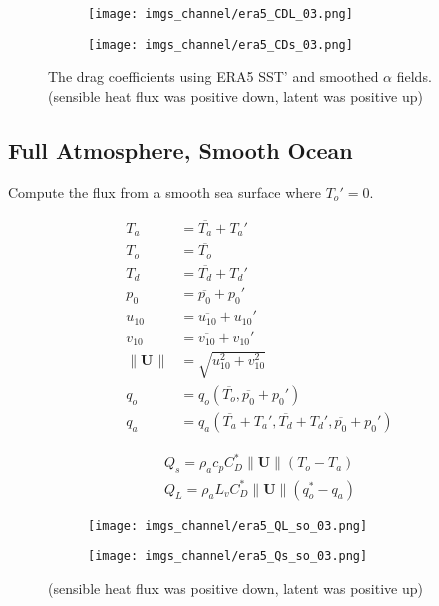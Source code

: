 \documentclass[12pt,a4paper]{article}
\newcommand{\Vmag}[1]{\| \mathbf{#1}\|}
\begin{document}
\begin{figure}[h!]
\centering
\begin{subfigure}[t]{0.49\textwidth}
\texttt{[image: imgs\_channel/era5\_CDL\_03.png]}
\end{subfigure}
\begin{subfigure}[t]{0.49\textwidth}
\texttt{[image: imgs\_channel/era5\_CDs\_03.png]}
\end{subfigure}
\caption{The drag coefficients using ERA5 SST' and smoothed $\alpha$ fields. (sensible heat flux was positive down, latent was positive up)}
\end{figure}

\subsection{Full Atmosphere, Smooth Ocean}
Compute the flux from a smooth sea surface where $T_o' = 0$.

\begin{align}
T_a &=\overline{T_a} + T_a' \\
T_o &=\overline{T_o}  \\
T_d &=\overline{T_d} + T_d' \\
p_0 &=\overline{p_0} + p_0' \\
u_{10} &= \overline{u_{10}} + u_{10}' \\
v_{10} &= \overline{v_{10}} + v_{10}'\\
\Vmag{U} &= \sqrt{u_{10}^2 + v_{10}^2}\\
q_o &= q_o(\overline{T_o},\overline{p_0}+p_0')\\
q_a &= q_a(\overline{T_a}+T_a',\overline{T_d}+T_d',\overline{p_0}+p_0')
\end{align}

\begin{align}
Q_s = \rho_a c_p  C_D^* \Vmag{U} (T_o-T_a) \label{Eq:Qs}\\
Q_L = \rho_a L_v  C_D^* \Vmag{U} (q_o^*-q_a) \label{Eq:QL}
\end{align}


\begin{figure}[h!]
\centering
\begin{subfigure}[t]{0.49\textwidth}
\texttt{[image: imgs\_channel/era5\_QL\_so\_03.png]}
\end{subfigure}
\begin{subfigure}[t]{0.49\textwidth}
\texttt{[image: imgs\_channel/era5\_Qs\_so\_03.png]}
\end{subfigure}
\caption{(sensible heat flux was positive down, latent was positive up)}
\end{figure}
\end{document}
